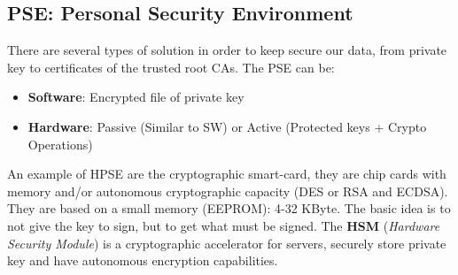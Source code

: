 \documentclass[12pt]{article}
\begin{document}
\subsection{PSE: Personal Security Environment}
There are several types of solution in order to keep secure our data, from private key to certificates of the trusted root CAs. The PSE can be:
\begin{itemize}
  \item \textbf{Software}: Encrypted file of private key
  \item \textbf{Hardware}: Passive (Similar to SW) or Active (Protected keys + Crypto Operations)
\end{itemize}
An example of HPSE are the cryptographic smart-card, they are chip cards with memory and/or autonomous cryptographic capacity (DES or RSA and ECDSA). They are based on a small memory (EEPROM): 4-32 KByte. The basic idea is to not give the key to sign, but to get what must be signed.
The \textbf{HSM} (\textit{Hardware Security Module}) is a cryptographic accelerator for servers, securely store private key and have autonomous encryption capabilities.\\
\end{document}
